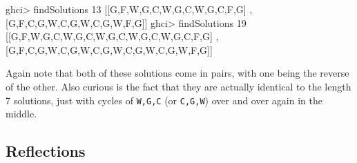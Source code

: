 \documentclass[]{article}
\newenvironment{Shaded}{}{}
\newcommand{\DataTypeTok}[1]{\textcolor[rgb]{0.56,0.13,0.00}{#1}}
\newcommand{\DecValTok}[1]{\textcolor[rgb]{0.25,0.63,0.44}{#1}}
\newcommand{\FunctionTok}[1]{\textcolor[rgb]{0.02,0.16,0.49}{#1}}
\newcommand{\NormalTok}[1]{#1}
\begin{document}
\begin{Shaded}
\begin{Highlighting}[]
\NormalTok{ghci}\FunctionTok{>}\NormalTok{ findSolutions }\DecValTok{13}
\NormalTok{[[}\DataTypeTok{G}\NormalTok{,}\DataTypeTok{F}\NormalTok{,}\DataTypeTok{W}\NormalTok{,}\DataTypeTok{G}\NormalTok{,}\DataTypeTok{C}\NormalTok{,}\DataTypeTok{W}\NormalTok{,}\DataTypeTok{G}\NormalTok{,}\DataTypeTok{C}\NormalTok{,}\DataTypeTok{W}\NormalTok{,}\DataTypeTok{G}\NormalTok{,}\DataTypeTok{C}\NormalTok{,}\DataTypeTok{F}\NormalTok{,}\DataTypeTok{G}\NormalTok{]}
\NormalTok{,[}\DataTypeTok{G}\NormalTok{,}\DataTypeTok{F}\NormalTok{,}\DataTypeTok{C}\NormalTok{,}\DataTypeTok{G}\NormalTok{,}\DataTypeTok{W}\NormalTok{,}\DataTypeTok{C}\NormalTok{,}\DataTypeTok{G}\NormalTok{,}\DataTypeTok{W}\NormalTok{,}\DataTypeTok{C}\NormalTok{,}\DataTypeTok{G}\NormalTok{,}\DataTypeTok{W}\NormalTok{,}\DataTypeTok{F}\NormalTok{,}\DataTypeTok{G}\NormalTok{]]}
\NormalTok{ghci}\FunctionTok{>}\NormalTok{ findSolutions }\DecValTok{19}
\NormalTok{[[}\DataTypeTok{G}\NormalTok{,}\DataTypeTok{F}\NormalTok{,}\DataTypeTok{W}\NormalTok{,}\DataTypeTok{G}\NormalTok{,}\DataTypeTok{C}\NormalTok{,}\DataTypeTok{W}\NormalTok{,}\DataTypeTok{G}\NormalTok{,}\DataTypeTok{C}\NormalTok{,}\DataTypeTok{W}\NormalTok{,}\DataTypeTok{G}\NormalTok{,}\DataTypeTok{C}\NormalTok{,}\DataTypeTok{W}\NormalTok{,}\DataTypeTok{G}\NormalTok{,}\DataTypeTok{C}\NormalTok{,}\DataTypeTok{W}\NormalTok{,}\DataTypeTok{G}\NormalTok{,}\DataTypeTok{C}\NormalTok{,}\DataTypeTok{F}\NormalTok{,}\DataTypeTok{G}\NormalTok{]}
\NormalTok{,[}\DataTypeTok{G}\NormalTok{,}\DataTypeTok{F}\NormalTok{,}\DataTypeTok{C}\NormalTok{,}\DataTypeTok{G}\NormalTok{,}\DataTypeTok{W}\NormalTok{,}\DataTypeTok{C}\NormalTok{,}\DataTypeTok{G}\NormalTok{,}\DataTypeTok{W}\NormalTok{,}\DataTypeTok{C}\NormalTok{,}\DataTypeTok{G}\NormalTok{,}\DataTypeTok{W}\NormalTok{,}\DataTypeTok{C}\NormalTok{,}\DataTypeTok{G}\NormalTok{,}\DataTypeTok{W}\NormalTok{,}\DataTypeTok{C}\NormalTok{,}\DataTypeTok{G}\NormalTok{,}\DataTypeTok{W}\NormalTok{,}\DataTypeTok{F}\NormalTok{,}\DataTypeTok{G}\NormalTok{]]}
\end{Highlighting}
\end{Shaded}

Again note that both of these solutions come in pairs, with one being the
reverse of the other. Also curious is the fact that they are actually identical
to the length 7 solutions, just with cycles of \texttt{W,G,C} (or
\texttt{C,G,W}) over and over again in the middle.

\hypertarget{reflections}{%
\subsection{Reflections}\label{reflections}}
\end{document}
